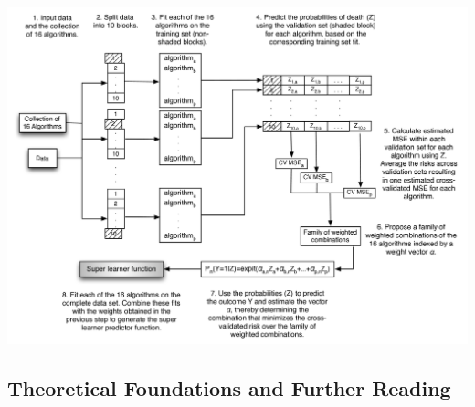 \documentclass[12pt, krantz2,]{krantz}
\theoremstyle{definition}
\theoremstyle{definition}
\theoremstyle{definition}
\newcommand{\1}{\mathbbm{1}}
\begin{document}
\begin{center}\includegraphics[width=0.8\linewidth]{img/png/SLKaiserNew} \end{center}

\hypertarget{theoretical-foundations-and-further-reading}{%
\subsection{Theoretical Foundations and Further Reading}\label{theoretical-foundations-and-further-reading}}
\end{document}
